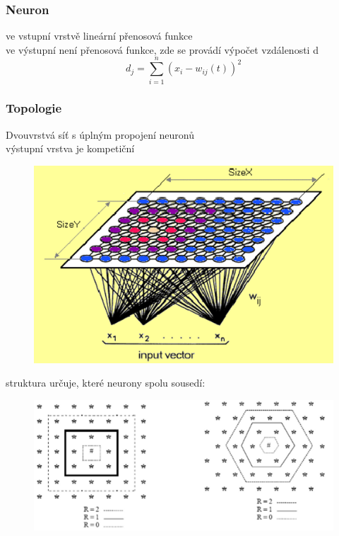 \subsubsection*{Neuron}
ve vstupní vrstvě lineární přenosová funkce\\
ve výstupní není přenosová funkce, zde se provádí výpočet vzdálenosti d
\begin{equation}
    d_j = \sum^n_{i=1} \left(x_i - w_{ij}(t)\right)^2 
\end{equation}
\subsubsection*{Topologie}
Dvouvrstvá síť s úplným propojení neuronů\\
výstupní vrstva je kompetiční\\
\begin{figure}[H]
    \includegraphics[scale = 0.3]{images/kohonen_topologie.png}
\end{figure}
\newpage
struktura určuje, které neurony spolu sousedí:
\begin{figure}[H]
    \includegraphics[scale = 0.3]{images/kohonen_struktura.png}
\end{figure}

